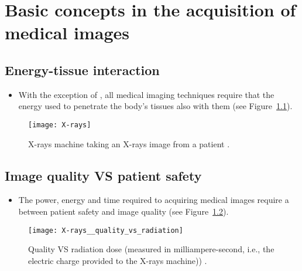 
\chapter{Basic concepts in the acquisition of medical images}

\section{Energy-tissue interaction}
\begin{itemize}
\item With the exception of , all medical imaging
  techniques require that the energy used to penetrate the body's
  tissues also  with them \cite{bushberg2011essential} (see
  Figure~\ref{fig:X-rays}).
\end{itemize}
\vspace{-5ex}
\begin{figure}[!h]
  \centering
  \texttt{[image: X-rays]}
  \caption{X-rays machine taking an X-rays image from a
    patient \cite{CC2025Xray}.\label{fig:X-rays}}
\end{figure}

\section{Image quality VS patient safety}
\begin{itemize}
\item The power, energy and time required to acquiring medical images
  require a  between patient safety and image quality
  \cite{bushberg2011essential} (see
  Figure~\ref{fig:quality_vs_radiation}).
\end{itemize}
\vspace{-3ex}
\begin{figure}[!h]
  \centering
  \texttt{[image: X-rays\_\_quality\_vs\_radiation]}
  \caption{Quality VS radiation dose (measured in milliampere-second,
    i.e., the electric charge provided to the X-rays
    machine))
    \cite{huda2015radiographic}.\label{fig:quality_vs_radiation}}
\end{figure}

